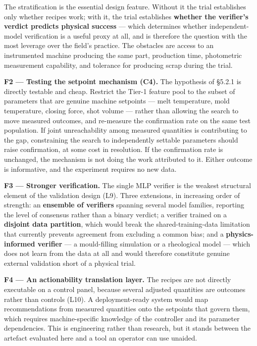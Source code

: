 The stratification is the essential design feature. Without it the trial establishes only whether recipes work; with it, the trial establishes \textbf{whether the verifier's verdict predicts physical success} --- which determines whether independent-model verification is a useful proxy at all, and is therefore the question with the most leverage over the field's practice. The obstacles are access to an instrumented machine producing the same part, production time, photometric measurement capability, and tolerance for producing scrap during the trial.

\textbf{F2 --- Testing the setpoint mechanism (C4).} The hypothesis of §5.2.1 is directly testable and cheap. Restrict the Tier-1 feature pool to the subset of parameters that are genuine machine setpoints --- melt temperature, mold temperature, closing force, shot volume --- rather than allowing the search to move measured outcomes, and re-measure the confirmation rate on the same test population. If joint unreachability among measured quantities is contributing to the gap, constraining the search to independently settable parameters should raise confirmation, at some cost in resolution. If the confirmation rate is unchanged, the mechanism is not doing the work attributed to it. Either outcome is informative, and the experiment requires no new data.

\textbf{F3 --- Stronger verification.} The single MLP verifier is the weakest structural element of the validation design (L9). Three extensions, in increasing order of strength: an \textbf{ensemble of verifiers} spanning several model families, reporting the level of consensus rather than a binary verdict; a verifier trained on a \textbf{disjoint data partition}, which would break the shared-training-data limitation that currently prevents agreement from excluding a common bias; and a \textbf{physics-informed verifier} --- a mould-filling simulation or a rheological model --- which does not learn from the data at all and would therefore constitute genuine external validation short of a physical trial.

\textbf{F4 --- An actionability translation layer.} The recipes are not directly executable on a control panel, because several adjusted quantities are outcomes rather than controls (L10). A deployment-ready system would map recommendations from measured quantities onto the setpoints that govern them, which requires machine-specific knowledge of the controller and its parameter dependencies. This is engineering rather than research, but it stands between the artefact evaluated here and a tool an operator can use unaided.

